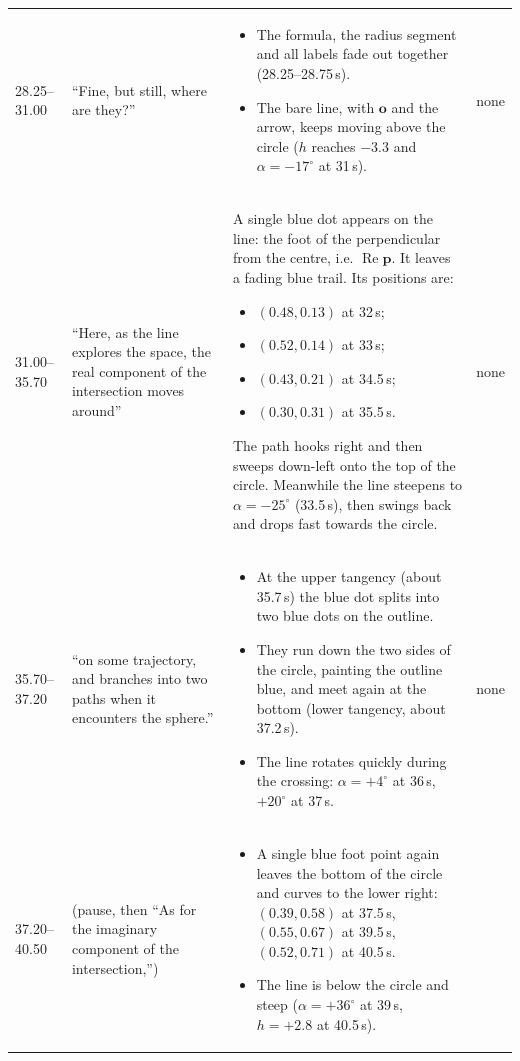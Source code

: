 \documentclass[10pt,a4paper]{article}
\newcommand{\vo}{\mathbf{o}}\newcommand{\vd}{\mathbf{d}}\newcommand{\vp}{\mathbf{p}}
\begin{document}
\begin{longtable}{@{}p{14mm}p{38mm}p{80mm}p{28mm}@{}}
28.25--31.00 & ``Fine, but still, where are they?'' &
\begin{itemize}
\item The formula, the radius segment and all labels fade out together (28.25--28.75\,s).
\item The bare line, with $\vo$ and the arrow, keeps moving above the circle ($h$ reaches $-3.3$ and $\alpha=-17^\circ$ at 31\,s).
\end{itemize} & none\\
31.00--35.70 & ``Here, as the line explores the space, the real component of the intersection moves around'' &
A single blue dot appears on the line: the foot of the perpendicular from the centre, i.e. $\operatorname{Re}\vp$. It leaves a fading blue trail. Its positions are:
\begin{itemize}
\item $(0.48,0.13)$ at 32\,s;
\item $(0.52,0.14)$ at 33\,s;
\item $(0.43,0.21)$ at 34.5\,s;
\item $(0.30,0.31)$ at 35.5\,s.
\end{itemize}
The path hooks right and then sweeps down-left onto the top of the circle. Meanwhile the line steepens to $\alpha=-25^\circ$ (33.5\,s), then swings back and drops fast towards the circle. & none\\
35.70--37.20 & ``on some trajectory, and branches into two paths when it encounters the sphere.'' &
\begin{itemize}
\item At the upper tangency (about 35.7\,s) the blue dot splits into two blue dots on the outline.
\item They run down the two sides of the circle, painting the outline blue, and meet again at the bottom (lower tangency, about 37.2\,s).
\item The line rotates quickly during the crossing: $\alpha=+4^\circ$ at 36\,s, $+20^\circ$ at 37\,s.
\end{itemize} & none\\
37.20--40.50 & (pause, then ``As for the imaginary component of the intersection,'') &
\begin{itemize}
\item A single blue foot point again leaves the bottom of the circle and curves to the lower right: $(0.39,0.58)$ at 37.5\,s, $(0.55,0.67)$ at 39.5\,s, $(0.52,0.71)$ at 40.5\,s.
\item The line is below the circle and steep ($\alpha=+36^\circ$ at 39\,s, $h=+2.8$ at 40.5\,s).

\end{itemize}
\end{longtable}
\end{document}
